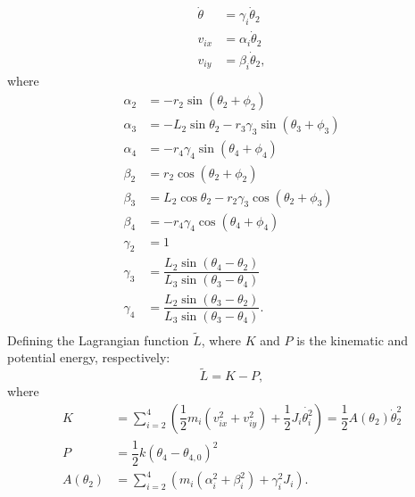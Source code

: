 \documentclass[12pt,letterpape]{article}
\begin{document}
\begin{align}
	\dot{ \theta } &= \gamma_i \dot{\theta}_2\\
	v_{ix} &= \alpha_i \dot{\theta}_2\\
	v_{iy} &= \beta_i \dot{\theta}_2,
\end{align}
% 
where
\begin{align}
	\alpha_2 &= -r_2\sin( \theta_2 + \phi_2 )\\
	\alpha_3 &= -L_2\sin\theta_2  -r_3 \gamma_3 \sin(\theta_3 + \phi_3)  \\
	\alpha_4 &= -r_4 \gamma_4 \sin( \theta_4 + \phi_4 ) \\
	\beta_2 &= r_2 \cos(\theta_2 + \phi_2) \\
	\beta_3 &= L_2 \cos\theta_2 - r_2 \gamma_3 \cos( \theta_2 + \phi_3 ) \\
	\beta_4 &= -r_4 \gamma_4 \cos(\theta_4 + \phi_4) \\
	\gamma_2 &= 1 \\
	\gamma_3 &= \dfrac{L_2 \sin( \theta_4 - \theta_2 ) }{L_3 \sin( \theta_3 - \theta_4 ) } \\
	\gamma_4 &= \dfrac{L_2 \sin( \theta_3 - \theta_2 ) }{L_3 \sin( \theta_3 - \theta_4 ) }. \\
\end{align}
% 
Defining the Lagrangian function $\tilde{L}$, where $K$ and $P$ is the kinematic
and potential energy, respectively:
$$
	\tilde{L} = K- P,
$$
% 
where
%
\begin{align}
	K &= \sum_{i=2}^4  \left( \dfrac{1}{2} m_i ( v^2_{ix} + v^2_{iy} )
		+ \dfrac{1}{2} J_i \dot{ \theta_i^2 }  \right) = \dfrac{1}{2} A(\theta_2) \dot{\theta}_2^2  \\
	P &= \dfrac{1}{2}k (\theta_4 - \theta_{4,0})^2  \\ 
	A( \theta_2 ) &= \sum_{i=2}^4 ( m_i (\alpha_i^2 + \beta_i^2) + \gamma_i^2 J_i ).
\end{align}
\end{document}
